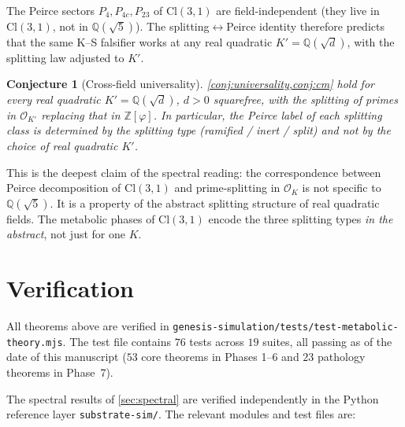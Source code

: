 \documentclass[11pt,a4paper]{article}
\theoremstyle{plain}
\newtheorem{conjecture}[theorem]{Conjecture}
\theoremstyle{definition}
\theoremstyle{remark}
\numberwithin{equation}{section}
\providecommand{\Cl}{\mathrm{Cl}}
\providecommand{\Z}{\mathbb{Z}}
\providecommand{\Q}{\mathbb{Q}}
\providecommand{\vp}{\varphi}
\providecommand{\cO}{\mathcal{O}}
\begin{document}
The Peirce sectors $P_4, P_{4c}, P_{23}$ of $\Cl(3,1)$ are
field-independent (they live in $\Cl(3,1)$, not in $\Q(\sqrt 5)$).
The splitting$\leftrightarrow$Peirce identity therefore predicts
that the same K--S falsifier works at any real quadratic
$K' = \Q(\sqrt d)$, with the splitting law adjusted to $K'$.

\begin{conjecture}[Cross-field universality]
\label{conj:cross-field}
\cref{conj:universality,conj:cm} hold for every real quadratic
$K' = \Q(\sqrt d)$, $d > 0$ squarefree, with the splitting of
primes in $\cO_{K'}$ replacing that in $\Z[\vp]$. In particular,
the Peirce label of each splitting class is determined by the
splitting \emph{type} (ramified / inert / split) and not by the
choice of real quadratic $K'$.
\end{conjecture}

This is the deepest claim of the spectral reading: the
correspondence between Peirce decomposition of $\Cl(3,1)$ and
prime-splitting in $\cO_K$ is not specific to $\Q(\sqrt 5)$. It
is a property of the abstract splitting structure of real quadratic
fields. The metabolic phases of $\Cl(3,1)$ encode the three
splitting types \emph{in the abstract}, not just for one $K$.

\section{Verification}
\label{sec:tests}

All theorems above are verified in
\texttt{genesis-simulation/tests/test-metabolic-theory.mjs}. The
test file contains $76$ tests across $19$ suites, all passing as
of the date of this manuscript ($53$ core theorems in Phases 1--6
and $23$ pathology theorems in Phase~7).

The spectral results of \cref{sec:spectral} are verified
independently in the Python reference layer
\texttt{substrate-sim/}. The relevant modules and test files are:
\end{document}

